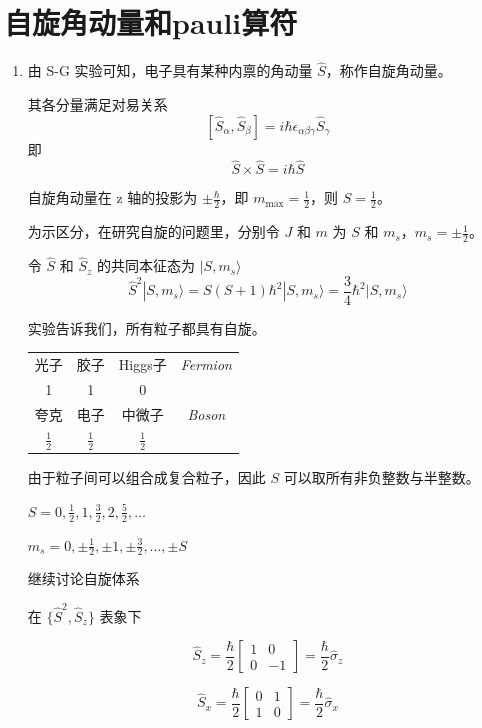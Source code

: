 \documentclass[lang=cn,10pt]{elegantbook}
\begin{document}
\section{自旋角动量和pauli算符}
\begin{enumerate}
	\item 由 S-G 实验可知，电子具有某种内禀的角动量 \(\hat{S}\)，称作自旋角动量。
	
	其各分量满足对易关系
	\[
	[\hat{S}_\alpha, \hat{S}_\beta] = i \hbar \epsilon_{\alpha \beta \gamma} \hat{S}_\gamma
	\]
	即
	\[
	\hat{S} \times \hat{S} = i \hbar \hat{S}
	\]
	
		自旋角动量在 z 轴的投影为 \(\pm \frac{\hbar}{2}\)，即 \(m_{\text{max}} = \frac{1}{2}\)，则 \(S = \frac{1}{2}\)。
	
	为示区分，在研究自旋的问题里，分别令 \(J\) 和 \(m\) 为 \(S\) 和 \(m_s\)，\(m_s = \pm \frac{1}{2}\)。
	
	令 \(\hat{S}\) 和 \(\hat{S}_z\) 的共同本征态为 \(|S, m_s\rangle\)
	\[
	\hat{S}^2 |S, m_s\rangle = S(S+1) \hbar^2 |S, m_s\rangle = \frac{3}{4} \hbar^2 |S, m_s\rangle
	\]
	
	实验告诉我们，所有粒子都具有自旋。
	
	\begin{tabular}{cccc}
		光子 & 胶子 & Higgs子 & \textit{Fermion} \\
		1 & 1 & 0 & \\
		夸克 & 电子 & 中微子 & \textit{Boson} \\
		$\frac{1}{2}$ & $\frac{1}{2}$ & $\frac{1}{2}$ & \\
	\end{tabular}
	
	由于粒子间可以组合成复合粒子，因此 $S$ 可以取所有非负整数与半整数。
	
	$S = 0, \frac{1}{2}, 1, \frac{3}{2}, 2, \frac{5}{2}, \ldots$
	
	$m_s = 0, \pm \frac{1}{2}, \pm 1, \pm \frac{3}{2}, \ldots, \pm S$
	
	继续讨论自旋体系
	
	在 $\{\hat{S}^2, \hat{S}_z\}$ 表象下
	
	\[
	\hat{S}_z = \frac{\hbar}{2} \begin{bmatrix} 1 & 0 \\ 0 & -1 \end{bmatrix} = \frac{\hbar}{2} \hat{\sigma}_z
	\]
	
	\[
	\hat{S}_x = \frac{\hbar}{2} \begin{bmatrix} 0 & 1 \\ 1 & 0 \end{bmatrix} = \frac{\hbar}{2} \hat{\sigma}_x
	\]
	

\end{enumerate}
\end{document}
